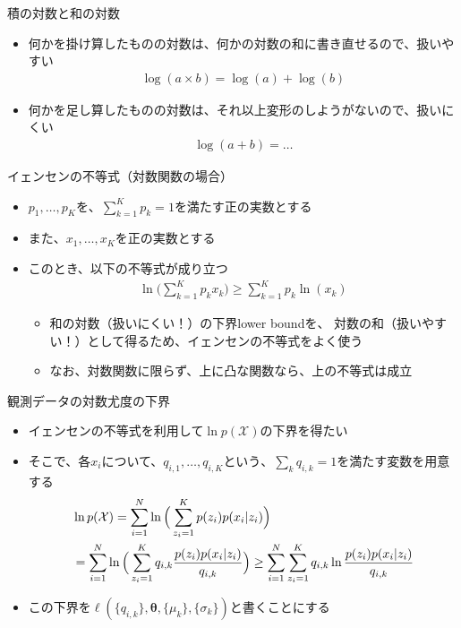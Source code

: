 \documentclass[aspectratio=169,unicode,dvipdfmx,14pt]{beamer}
\begin{document}
\begin{frame}{積の対数と和の対数}
\begin{itemize}
\item 何かを掛け算したものの対数は、何かの対数の和に書き直せるので、扱いやすい
\begin{align}
\log(a \times b) = \log(a) + \log(b)
\end{align}
\item 何かを足し算したものの対数は、それ以上変形のしようがないので、扱いにくい
\begin{align}
\log(a + b) = \ldots
\end{align}\end{itemize}
\end{frame}

\begin{frame}{イェンセンの不等式（対数関数の場合）}
\begin{itemize}
\item $p_1,\ldots,p_K$を、$\sum_{k=1}^K p_k=1$を満たす正の実数とする
\item また、$x_1,\ldots, x_K$を正の実数とする
\item このとき、以下の不等式が成り立つ
\begin{align}
\ln \bigg( \sum_{k=1}^K p_k x_k \bigg) \geq \sum_{k=1}^K p_k \ln(x_k)
\end{align}
\begin{itemize}
\item 和の対数（扱いにくい！）の下界lower boundを、
対数の和（扱いやすい！）として得るため、イェンセンの不等式をよく使う
\item なお、対数関数に限らず、上に凸な関数なら、上の不等式は成立
\end{itemize}
\end{itemize}
\end{frame}

\begin{frame}{観測データの対数尤度の下界}
\begin{itemize}
\item イェンセンの不等式を利用して$\ln p(\mathcal{X})$の下界を得たい
\item そこで、各$x_i$について、$q_{i,1}, \ldots, q_{i,K}$という、$\sum_k q_{i,k}=1$を満たす変数を用意する
\begin{align}
& \ln p(\mathcal{X}) = \sum_{i=1}^N \ln \Big( \sum_{z_i=1}^K p(z_i) p(x_i | z_i) \Big)
\notag \\ & = \sum_{i=1}^N \ln \Big( \sum_{z_i=1}^K q_{i,k} \frac{p(z_i) p(x_i | z_i)}{q_{i,k}} \Big)
\geq 
\sum_{i=1}^N \sum_{z_i=1}^K q_{i,k} \ln\frac{p(z_i) p(x_i | z_i)}{q_{i,k}}
\end{align}
\vspace{-.4in}
\item この下界を$\ell(\{q_{i,k}\},\bm{\theta},\{\mu_k\},\{\sigma_k\})$と書くことにする
\end{itemize}
\end{frame}
\end{document}
